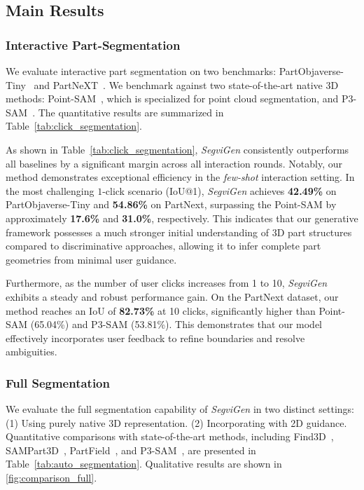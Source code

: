 \subsection{Main Results}
\subsubsection{Interactive Part-Segmentation}

We evaluate interactive part segmentation on two benchmarks: PartObjaverse-Tiny~\cite{partobjaverse_tiny} and PartNeXT~\cite{partnext}.
%
We benchmark against two state-of-the-art native 3D methods: Point-SAM~\cite{pointsam}, which is specialized for point cloud segmentation, and P3-SAM~\cite{p3sam}. The quantitative results are summarized in Table~\ref{tab:click_segmentation}.

As shown in Table~\ref{tab:click_segmentation}, \textit{SegviGen} consistently outperforms all baselines by a significant margin across all interaction rounds. Notably, our method demonstrates exceptional efficiency in the \textit{few-shot} interaction setting. In the most challenging $1$-click scenario (IoU@1), \textit{SegviGen} achieves \textbf{42.49\%} on PartObjaverse-Tiny and \textbf{54.86\%} on PartNext, surpassing the Point-SAM by approximately \textbf{17.6\%} and \textbf{31.0\%}, respectively. This indicates that our generative framework possesses a much stronger initial understanding of 3D part structures compared to discriminative approaches, allowing it to infer complete part geometries from minimal user guidance.

Furthermore, as the number of user clicks increases from 1 to 10, \textit{SegviGen} exhibits a steady and robust performance gain. On the PartNext dataset, our method reaches an IoU of \textbf{82.73\%} at 10 clicks, significantly higher than Point-SAM (65.04\%) and P3-SAM (53.81\%). This demonstrates that our model effectively incorporates user feedback to refine boundaries and resolve ambiguities.

\subsubsection{Full Segmentation}

We evaluate the full segmentation capability of \textit{SegviGen} in two distinct settings:
(1) Using purely native 3D representation.
%
(2) Incorporating with 2D guidance. 
%
Quantitative comparisons with state-of-the-art methods, including Find3D~\cite{find3d}, SAMPart3D~\cite{sampart3d}, PartField~\cite{partfield}, and P3-SAM~\cite{p3sam}, are presented in Table~\ref{tab:auto_segmentation}.
Qualitative results are shown in \ref{fig:comparison_full}.

